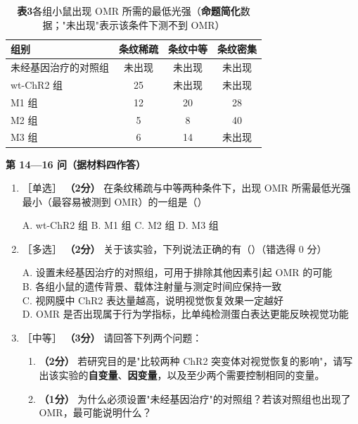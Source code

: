 \documentclass[UTF8,a4paper,11pt]{ctexart}
\newcommand{\pt}[1]{\textbf{（#1分）}}
\newcommand{\lv}[1]{{\small\color{deepgreen}［#1］}}
\newcommand{\key}[1]{\textbf{\color{deepred}#1}}
\newcommand{\choice}[1]{\par\smallskip\noindent #1\par}
\begin{document}
\begin{table}[H]
\centering\small
\caption*{\textbf{表3}\quad 各组小鼠出现 OMR 所需的最低光强（\key{命题简化}数据；"未出现"表示该条件下测不到 OMR）}
\begin{tabular}{@{}lccc@{}}
\toprule
\textbf{组别} & \textbf{条纹稀疏} & \textbf{条纹中等} & \textbf{条纹密集} \\
\midrule
未经基因治疗的对照组 & 未出现 & 未出现 & 未出现 \\
wt-ChR2 组 & 25 & 未出现 & 未出现 \\
M1 组 & 12 & 20 & 28 \\
M2 组 & 5 & 8 & 40 \\
M3 组 & 6 & 14 & 未出现 \\
\bottomrule
\end{tabular}
\end{table}

\begin{qbox}
\noindent\textbf{\color{deepgreen}第 14—16 问（据材料四作答）}
\begin{enumerate}[leftmargin=2.2em,itemsep=5pt,start=14]
\item \lv{单选} \pt{2} 在条纹稀疏与中等两种条件下，出现 OMR 所需最低光强最小（最容易被测到 OMR）的一组是（\quad）\\
\choice{A. wt-ChR2 组 \quad B. M1 组 \quad C. M2 组 \quad D. M3 组}

\item \lv{多选} \pt{2} 关于该实验，下列说法正确的有（\quad）（错选得 0 分）\\
\choice{A. 设置未经基因治疗的对照组，可用于排除其他因素引起 OMR 的可能\\
B. 各组小鼠的遗传背景、载体注射量与测定时间应保持一致\\
C. 视网膜中 ChR2 表达量越高，说明视觉恢复效果一定越好\\
D. OMR 是否出现属于行为学指标，比单纯检测蛋白表达更能反映视觉功能}

\item \lv{中等} \pt{3} 请回答下列两个问题：
\begin{enumerate}[label=(\arabic*),leftmargin=1.4em,itemsep=2pt]
\item \pt{2} 若研究目的是"比较两种 ChR2 突变体对视觉恢复的影响"，请写出该实验的\textbf{自变量}、\textbf{因变量}，以及至少两个需要控制相同的变量。
\item \pt{1} 为什么必须设置"未经基因治疗"的对照组？若该对照组也出现了 OMR，最可能说明什么？
\end{enumerate}
\end{enumerate}
\end{qbox}
\end{document}
